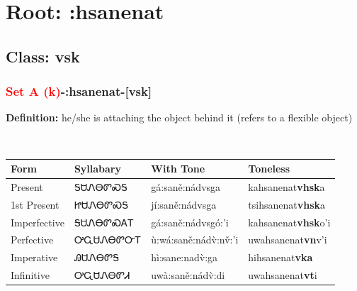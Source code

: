 \needspace{4in}
\section*{Root: :hsanenat}
\nopagebreak
{}
\needspace{3in}
\subsection*{Class: vsk}
\nopagebreak
\needspace{2in}
\subsubsection*{\textcolor{Red}{Set A (k)}{-}\textbf{:hsanenat}{-}[vsk]}
\nopagebreak
\textbf{Definition: } he/she is attaching the object behind it (refers to a flexible object)
\\[0.5em]
\begin{tabularx}{\textwidth}{l X X X}%
\toprule%
\textbf{Form}&\textbf{Syllabary}&\textbf{With Tone}&\textbf{Toneless}\\%
\midrule%
Present&ᎦᏌᏁᎾᏛᏍᎦ&gá:saně:nádvsga&kahsanenat\textbf{vhsk}a\\%
1st Present&ᏥᏌᏁᎾᏛᏍᎦ&jí:saně:nádvsga&tsihsanenat\textbf{vhsk}a\\%
Imperfective&ᎦᏌᏁᎾᏛᏍᎪᎢ&gá:saně:nádvsgó:’i&kahsanenat\textbf{vhsk}o'i\\%
Perfective&ᎤᏩᏌᏁᎾᏛᏅᎢ&ù:wá:saně:nádv̀:nv̌:’i&uwahsanenat\textbf{vn}v'i\\%
Imperative&ᎯᏌᏁᎾᏛᎦ&hì:sane:nadv̀:ga&hihsanenat\textbf{vka}\\%
Infinitive&ᎤᏩᏌᏁᎾᏛᏗ&uwà:saně:nádv̀:di&uwahsanenat\textbf{vt}i\\%
\bottomrule%
\end{tabularx}
\\[1em]